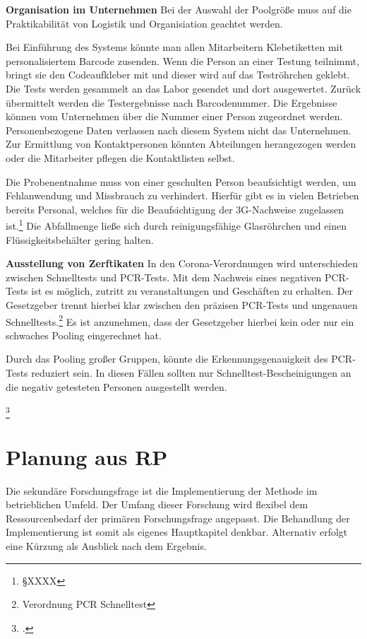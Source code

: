 \cleardoublepage

\textbf{Organisation im Unternehmen}\newline
Bei der Auswahl der Poolgröße muss auf die Praktikabilität von Logistik und Organisiation geachtet werden.

Bei Einführung des Systems könnte man allen Mitarbeitern Klebetiketten mit personalisiertem Barcode zusenden.
Wenn die Person an einer Testung teilnimmt, bringt sie den Codeaufkleber mit und dieser wird auf das Teströhrchen geklebt.
Die Tests werden gesammelt an das Labor gesendet und dort ausgewertet.
Zurück übermittelt werden die Testergebnisse nach Barcodenummer.
Die Ergebnisse können vom Unternehmen über die Nummer einer Person zugeordnet werden.
Personenbezogene Daten verlassen nach diesem System nicht das Unternehmen.
Zur Ermittlung von Kontaktpersonen könnten Abteilungen herangezogen werden oder die Mitarbeiter pflegen die Kontaktlisten selbst.

Die Probenentnahme muss von einer geschulten Person beaufsichtigt werden, um Fehlanwendung und Missbrauch zu verhindert.
Hierfür gibt es in vielen Betrieben bereits Personal, welches für die Beaufsichtigung der 3G-Nachweise zugelassen ist.\footnote{§XXXX}
Die Abfallmenge ließe sich durch reinigungsfähige Glasröhrchen und einen Flüssigkeitsbehälter gering halten.

\textbf{Ausstellung von Zerftikaten}\newline
In den Corona-Verordnungen wird unterschieden zwischen Schnelltests und PCR-Tests.
Mit dem Nachweis eines negativen PCR-Tests ist es möglich, zutritt zu veranstaltungen und Geschäften zu erhalten.
Der Gesetzgeber trennt hierbei klar zwischen den präzisen PCR-Tests und ungenauen Schnelltests.\footnote{Verordnung PCR Schnelltest}
Es ist anzunehmen, dass der Gesetzgeber hierbei kein oder nur ein schwaches Pooling eingerechnet hat.

Durch das Pooling großer Gruppen, könnte die Erkennungsgenauigkeit des PCR-Tests reduziert sein.
In diesen Fällen sollten nur Schnelltest-Bescheinigungen an die negativ getesteten Personen ausgestellt werden.


\footcite{TD15}
\cleardoublepage




\section{Planung aus RP}
Die sekundäre Forschungsfrage ist die Implementierung der Methode im betrieblichen Umfeld.
Der Umfang dieser Forschung wird flexibel dem Ressourcenbedarf der primären Forschungsfrage angepasst.
Die Behandlung der Implementierung ist somit als eigenes Hauptkapitel denkbar.
Alternativ erfolgt eine Kürzung als Ausblick nach dem Ergebnis.

